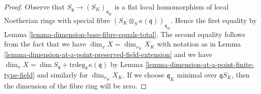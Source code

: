 \begin{proof}
Observe that $S_\mathfrak q \to (S_K)_{\mathfrak q_K}$ is a flat
local homomorphism of local Noetherian rings with special fibre
$(S_K \otimes_S \kappa(\mathfrak q))_{\mathfrak q_K}$. Hence the first
equality by Lemma \ref{lemma-dimension-base-fibre-equals-total}.
The second equality follows from the fact that we have
$\dim_x X = \dim_{x_K} X_K$ with notation as in
Lemma \ref{lemma-dimension-at-a-point-preserved-field-extension}
and we have
$\dim_x X = \dim S_\mathfrak q + \text{trdeg}_k \kappa(\mathfrak q)$
by Lemma \ref{lemma-dimension-at-a-point-finite-type-field}
and similarly for $\dim_{x_K} X_K$.
If we choose $\mathfrak q_K$ minimal over $\mathfrak q S_K$, then
the dimension of the fibre ring will be zero.
\end{proof}







